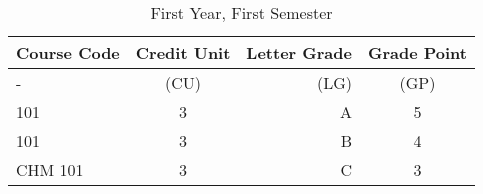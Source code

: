 \documentclass{article}
\begin{document}
 	 \begin{table}[h!] 
 	 	\begin{center} 
 	 		\caption{First Year, First Semester} \label{tab:table1} 
 	 		\begin{tabular}{l|c|r|c} 
 	 			\textbf{Course Code} & \textbf{Credit Unit} & \textbf{Letter Grade} & \textbf{Grade Point}\\
 	 			\hline 
 	 			- & (CU) & (LG) & (GP)\\
 	 			 \hline 
 	 			 101 & 3 & A & 5\\ 
 	 			 \hline
 	 			  101 & 3 & B & 4\\ 
 	 			  \hline
 	 			  CHM 101 & 3 & C & 3\\ 
 	 			  \hline
  			  \end{tabular}
  		   \end{center} 
  	   \end{table} 
     
\end{document}
